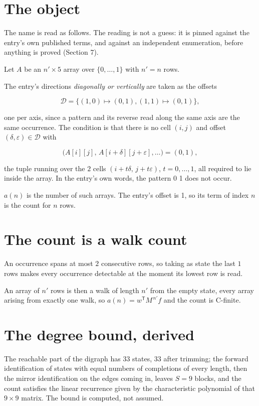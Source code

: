 \documentclass[11pt]{article}
\theoremstyle{definition}
\begin{document}
\section{The object}

The name is read as follows. The reading is not a guess: it is pinned against the entry's own published terms, and against an independent enumeration, before anything is proved (Section 7).

Let $A$ be an $n' \times 5$ array over $\{0,\dots,1\}$ with $n' = n$ rows.

The entry's directions {\itshape diagonally or vertically} are taken as the offsets

\[\mathcal{D} = \{(1,0)\mapsto(0,1), (1,1)\mapsto(0,1)\},\]

one per axis, since a pattern and its reverse read along the same axis are the same occurrence. The condition is that there is no cell $(i,j)$ and offset $(\delta,\varepsilon)\in\mathcal{D}$ with

\[\bigl(A[i][j],\,A[i{+}\delta][j{+}\varepsilon],\dots\bigr) = (0, 1),\]

the tuple running over the $2$ cells $(i+t\delta,\,j+t\varepsilon)$, $t = 0,\dots,1$, all required to lie inside the array. In the entry's own words, the pattern 0 1 does not occur.

$a(n)$ is the number of such arrays. The entry's offset is 1, so its term of index $n$ is the count for $n$ rows.

\section{The count is a walk count}

An occurrence spans at most $2$ consecutive rows, so taking as state the last $1$ rows makes every occurrence detectable at the moment its lowest row is read.

An array of $n'$ rows is then a walk of length $n'$ from the empty state, every array arising from exactly one walk, so $a(n) = w^{\mathsf T}M^{\,n'}f$ and the count is C-finite.

\section{The degree bound, derived}

The reachable part of the digraph has $33$ states, $33$ after trimming; the forward identification of states with equal numbers of completions of every length, then the mirror identification on the edges coming in, leaves $S = 9$ blocks, and the count satisfies the linear recurrence given by the characteristic polynomial of that $9\times9$ matrix. The bound is computed, not assumed.
\end{document}
